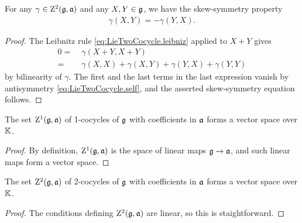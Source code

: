 \begin{lemma}
  \label{lem:LieTwoCocycle_skew_symmetry}
  \leanok
  For any $\gamma \in \mathrm{Z}^2(\mathfrak{g},\mathfrak{a})$ and any $X,Y \in \mathfrak{g}$,
  we have the skew-symmetry property
  \begin{align*}
    \gamma(X,Y) = - \gamma(Y,X) .
  \end{align*}
\end{lemma}
\begin{proof}
  \leanok
  The Leibnitz rule \eqref{eq:LieTwoCocycle.leibniz}
  applied to $X+Y$ gives
  \begin{align*}
    0 = \; & \gamma(X+Y,X+Y) \\
      = \; & \gamma(X,X) + \gamma(X,Y) + \gamma(Y,X) + \gamma(Y,Y)
  \end{align*}
  by bilinearity of $\gamma$. The first and the last terms
  in the last expression vanish by antisymmetry \eqref{eq:LieTwoCocycle.self},
  and the asserted skew-symmetry equation follows.
\end{proof}

\begin{lemma}
  \label{lem:LieOneCocycle_vectorSpace}
  \leanok
  The set $\mathrm{Z}^1(\mathfrak{g}, \mathfrak{a})$ of 1-cocycles of $\mathfrak{g}$ with
  coefficients in $\mathfrak{a}$ forms a vector space over $\mathbb{K}$.
\end{lemma}
\begin{proof}
  \leanok
  By definition, $\mathrm{Z}^1(\mathfrak{g}, \mathfrak{a})$ is the space of
  linear maps $\mathfrak{g} \to \mathfrak{a}$, and such linear maps form
  a vector space.
\end{proof}

\begin{lemma}
  \label{lem:LieTwoCocycle_vectorSpace}
  \leanok
  The set $\mathrm{Z}^2(\mathfrak{g}, \mathfrak{a})$ of 2-cocycles of $\mathfrak{g}$ with
  coefficients in $\mathfrak{a}$ forms a vector space over $\mathbb{K}$.
\end{lemma}
\begin{proof}
  \leanok
  The conditions defining $\mathrm{Z}^2(\mathfrak{g}, \mathfrak{a})$ are linear,
  so this is staightforward.
\end{proof}

